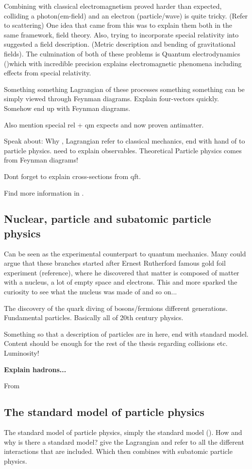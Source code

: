 Combining \abbrQM with classical electromagnetism proved harder than expected, colliding a photon(em-field) and an electron (particle/wave) is quite tricky. (Refer to scattering) One idea that came from this was to explain them both in the same framework, field theory.
Also, trying to incorporate special relativity into \abbrQM suggested a field description. (Metric description and bending of gravitational fields).
The culmination of both of these problems is Quantum electrodynamics (\abbrQED)which with incredible precision explains electromagnetic phenomena including effects from special relativity.\citep{Zee:2003}


Something something Lagrangian of these processes something something can be simply viewed through Feynman diagrams.
Explain four-vectors quickly.
Somehow end up with Feynman diagrams.

Also mention special rel + qm expects and now proven antimatter.

Speak about: Why \abbrQM, Lagrangian refer to classical mechanics, end with hand of to particle physics. need to explain observables.
Theoretical Particle physics comes from Feynman diagrams!

Dont forget to explain cross-sections from qft.

Find more information in \citep{Goldstein:2001,Bransden:2000, Zee:2003}.

\subsection{Nuclear, particle and subatomic particle physics}
Can be seen as the experimental counterpart to quantum mechanics.
Many could argue that these branches started after Ernest Rutherford famous gold foil experiment (reference), where he discovered that matter is composed of matter with a nucleus, a lot of empty space and electrons. This and more sparked the curiosity to see what the nucleus was made of and so on... 

The discovery of the quark diving of bosons/fermions different generations. Fundamental particles. Basically all of 20th century physics. 

Something so that a description of particles are in here, end with standard model.
Content should be enough for the rest of the thesis regarding collisions etc.
Luminosity!

\textbf{Explain hadrons...}

From \citep{Burchan:1995}

\subsection{The standard model of particle physics} 
The standard model of particle physics, simply the standard model (\abbrSM).
How and why is there a standard model? give the Lagrangian and refer to all the different interactions that are included. Which then combines \abbrQM with subatomic particle physics.

